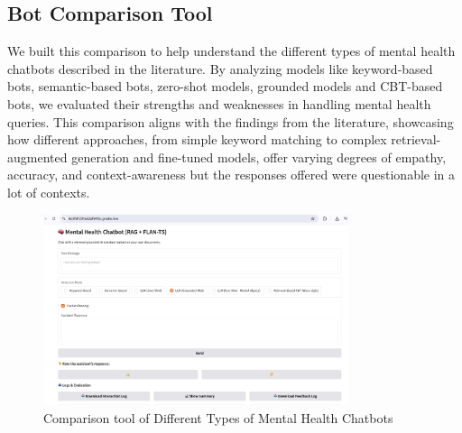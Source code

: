 \subsection{Bot Comparison Tool} 

We built this comparison to help understand the different types of mental health chatbots described in the literature. By analyzing models like keyword-based bots, semantic-based bots, zero-shot models, grounded models and CBT-based bots, we evaluated their strengths and weaknesses in handling mental health queries. This comparison aligns with the findings from the literature, showcasing how different approaches, from simple keyword matching to complex retrieval-augmented generation and fine-tuned models, offer varying degrees of empathy, accuracy, and context-awareness but the responses offered were questionable in a lot of contexts. 

\begin{figure}[htbp]
    \centering
    \includegraphics[width=0.8\textwidth]{bot_comparison_tool.jpeg}
    \caption{Comparison tool of Different Types of Mental Health Chatbots}
    \label{fig:bot_comparison}
\end{figure}


